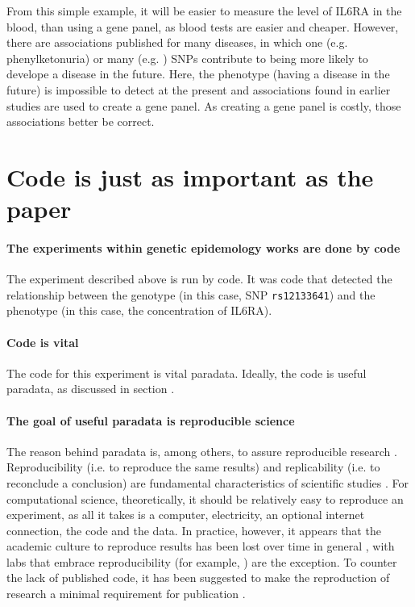 From this simple example, it will be easier
to measure the level of IL6RA in the blood, than using a gene panel,
as blood tests are easier and cheaper.
However, there are associations published for many diseases,
in which one (e.g. phenylketonuria) or many (e.g. \cite{bruce2009metabolic}) 
SNPs contribute to being more likely to develope a disease in the future. 
Here, the phenotype (having a disease in the future) 
is impossible to detect at the present
and associations found in earlier studies are used to create a gene panel.
As creating a gene panel is costly, those associations better be correct.

\section{Code is just as important as the paper}

\paragraph{The experiments within genetic epidemology works are done by code}

The experiment described above is run by code. 
It was code that detected the relationship between the genotype
(in this case, SNP \verb|rs12133641|) 
and the phenotype (in this case, the concentration of IL6RA).

\paragraph{Code is vital}

The code for this experiment is vital paradata.
Ideally, the code is useful paradata, 
as discussed in section \label{sec:making-code-useful-paradata}.

\paragraph{The goal of useful paradata is reproducible science}

The reason behind paradata is, among others,
to assure reproducible research \cite{huvila2022improving}.
Reproducibility (i.e. to reproduce the same results) 
and replicability (i.e. to reconclude a conclusion)
are fundamental characteristics of scientific studies \cite{patil2019visual}.
For computational science, theoretically, it should be relatively easy to 
reproduce an experiment, as all it takes is a computer, electricity,
an optional internet connection, the code and the data.
In practice, however, it appears that 
the academic culture to reproduce results 
has been lost over time in general \cite{peng2011reproducible},
with labs that embrace reproducibility (for example, \cite{barba2016hard})
are the exception.
To counter the lack of published code, 
it has been suggested to make the reproduction of research 
a minimal requirement for publication \cite{peng2011reproducible}.

